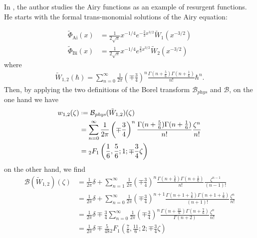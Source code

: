 \documentclass{article}
\theoremstyle{definition}
\newcommand*{\defeq}{\mathrel{\vcenter{\baselineskip0.5ex \lineskiplimit0pt
                     \hbox{\scriptsize.}\hbox{\scriptsize.}}}%
                     =}
\newcommand{\borel}{\mathcal{B}}
\begin{document}
In \cite{lectures-Marino}, the author studies the Airy functions as an example of resurgent functions. He starts with the formal trans-monomial solutions of the Airy equation:

\begin{align*}
\tilde{\Phi}_{\mathrm{Ai}}(x)&=\frac{1}{2\sqrt{\pi}}x^{-1/4}e^{-\tfrac{2}{3}x^{3/2}}\tilde{W}_1(x^{-3/2})\\
\tilde{\Phi}_{\mathrm{Bi}}(x)&=\frac{1}{2\sqrt{\pi}}x^{-1/4}e^{\tfrac{2}{3}x^{3/2}}\tilde{W}_2(x^{-3/2})
\end{align*}  
where 
\begin{align*}
\tilde{W}_{1,2}(\hbar)=\sum_{n=0}^{\infty}\frac{1}{2\pi}\left(\mp\frac{3}{4}\right)^{n}\frac{\Gamma(n+\frac{5}{6})\Gamma(n+\frac{1}{6})}{n!}\hbar^n.
\end{align*}
Then, by applying the two definitions of the Borel transform $\borel_{\textit{phys}}$ and $\borel$, on the one hand we have  
\begin{align*}
w_{1,2}(\zeta)&\defeq\borel_{\textit{phys}}(\tilde{W}_{1,2})(\zeta)\\
&=\sum_{n=0}^{\infty}\frac{1}{2\pi}\left(\mp\frac{3}{4}\right)^{n}\frac{\Gamma(n+\frac{5}{6})\Gamma(n+\frac{1}{6})}{n!}\frac{\zeta^n}{n!}\\
&={}_2F_1\left(\frac{1}{6},\frac{5}{6};1;\mp\frac{3}{4}\zeta\right) 
\end{align*}
on the other hand, we find
\begin{align*}
\borel(\tilde{W}_{1,2})(\zeta)&=\frac{1}{2\pi}\delta+\sum_{n=1}^{\infty} \frac{1}{2\pi}\left(\mp\frac{3}{4}\right)^{n}\frac{\Gamma(n+\frac{5}{6})\Gamma(n+\frac{1}{6})}{n!}\frac{\zeta^{n-1}}{(n-1)!}\\
&=\frac{1}{2\pi}\delta+\sum_{n=0}^{\infty} \frac{1}{2\pi}\left(\mp\frac{3}{4}\right)^{n+1}\frac{\Gamma(n+1+\frac{5}{6})\Gamma(n+1+\frac{1}{6})}{(n+1)!}\frac{\zeta^{n}}{n!}\\
&=\frac{1}{2\pi}\delta\mp\frac{3}{4}\sum_{n=0}^{\infty} \frac{1}{2\pi}\left(\mp\frac{3}{4}\right)^{n}\frac{\Gamma(n+\frac{11}{6})\Gamma(n+\frac{7}{6})}{\Gamma(n+2)}\frac{\zeta^{n}}{n!}\\
&=\frac{1}{2\pi}\delta\mp\frac{5}{48} {}_2F_1\left(\frac{7}{6},\frac{11}{6};2;\mp\frac{3}{4}\zeta\right)%
\end{align*}
\end{document}
